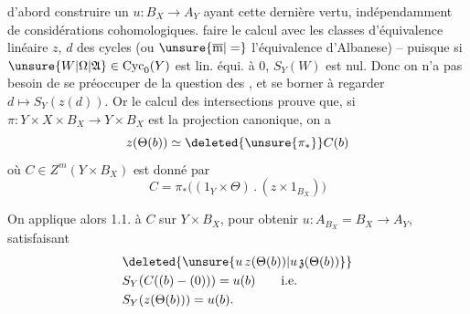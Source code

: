 d'abord construire un $u:B_X\longrightarrow A_Y$ ayant cette dernière vertu, indépendamment de considérations cohomologiques.  faire le calcul avec les classes d'équivalence linéaire $z$, $d$ des cycles (ou $\unsure{\overline{\mathrm m}|=}$ l'équivalence d'Albanese) -- puisque si $\unsure{W|\Omega|\mathfrak{A}}\in\operatorname{Cyc}_0(Y)$ est lin. équi. à $0$, $S_Y(W)$ est nul. Donc on n'a pas besoin de se préoccuper de la question  des , et se borner à regarder $d\longmapsto S_Y(z(d))$. Or le calcul des intersections prouve que, si $\pi:Y\times X\times B_X\longrightarrow Y\times B_X$ est la projection canonique,  on a 
\[
z(\Theta(b))\simeq\deleted{\unsure{\pi_*}}C(b)
\]
où $C\in Z^m(Y\times B_X)$ est donné par
\[
C=\pi_*\bigl((1_Y\times\Theta)\mathbin{.}(z\times1_{B_X})\bigr)
\]

On applique alors 1.1. à $C$ sur $Y\times B_X$, pour obtenir $u:A_{B_X}=B_X\longrightarrow A_Y$, satisfaisant
\[
\begin{aligned}
&\deleted{\unsure{u\,z(\Theta(b))|u\,\mathfrak{z}(\Theta(b))}}\\
&S_Y(C((b)-(0)))=u(b)\qquad\text{i.e.}\\
&S_Y(z(\Theta(b)))=u(b).
\end{aligned}
\]

